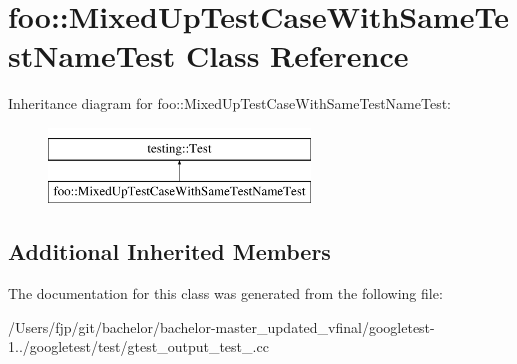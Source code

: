 \hypertarget{classfoo_1_1_mixed_up_test_case_with_same_test_name_test}{}\section{foo\+:\+:Mixed\+Up\+Test\+Case\+With\+Same\+Test\+Name\+Test Class Reference}
\label{classfoo_1_1_mixed_up_test_case_with_same_test_name_test}
Inheritance diagram for foo\+:\+:Mixed\+Up\+Test\+Case\+With\+Same\+Test\+Name\+Test\+:\begin{figure}[H]
\begin{center}
\leavevmode
\includegraphics[height=2.000000cm]{classfoo_1_1_mixed_up_test_case_with_same_test_name_test}
\end{center}
\end{figure}
\subsection*{Additional Inherited Members}


The documentation for this class was generated from the following file\+:\begin{DoxyCompactItemize}
\item 
/\+Users/fjp/git/bachelor/bachelor-\/master\+\_\+updated\+\_\+vfinal/googletest-\/1../googletest/test/gtest\+\_\+output\+\_\+test\+\_\+.\+cc\end{DoxyCompactItemize}

